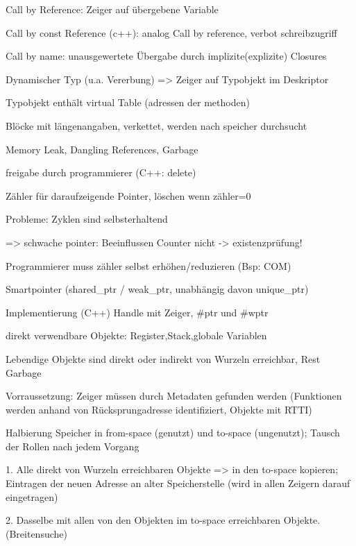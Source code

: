 Call by Reference: Zeiger auf übergebene Variable

Call by const Reference (c++): analog Call by reference, verbot schreibzugriff

Call by name: unausgewertete Übergabe durch implizite(explizite) Closures






Dynamischer Typ (u.a. Vererbung) => Zeiger auf Typobjekt im Deskriptor

Typobjekt enthält virtual Table (adressen der methoden)


Blöcke mit längenangaben, verkettet, werden nach speicher durchsucht

 Memory Leak, Dangling References, Garbage

freigabe durch programmierer (C++: delete)

Zähler für daraufzeigende Pointer, löschen wenn zähler=0

Probleme: Zyklen sind selbsterhaltend 

=> schwache pointer: Beeinflussen Counter nicht -> existenzprüfung!

 Programmierer muss zähler selbst erhöhen/reduzieren (Bsp: COM)

 Smartpointer (shared\_ptr / weak\_ptr, unabhängig davon unique\_ptr)

Implementierung (C++) Handle mit Zeiger, \#ptr und \#wptr

 direkt verwendbare Objekte: Register,Stack,globale Variablen

Lebendige Objekte sind direkt oder indirekt von Wurzeln erreichbar, Rest Garbage

Vorraussetzung: Zeiger müssen durch Metadaten gefunden werden (Funktionen werden anhand von Rücksprungadresse identifiziert, Objekte mit RTTI)

Halbierung Speicher in from-space (genutzt) und to-space (ungenutzt);
Tausch der Rollen nach jedem Vorgang

1. Alle direkt von Wurzeln erreichbaren Objekte => in den to-space kopieren; Eintragen der neuen Adresse an alter Speicherstelle (wird in allen Zeigern darauf eingetragen)

2. Dasselbe mit allen von den Objekten im to-space erreichbaren Objekte. (Breitensuche)

